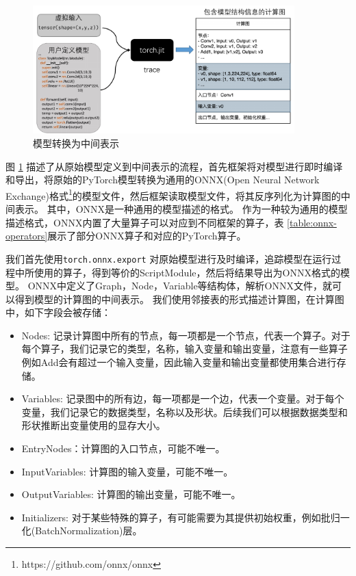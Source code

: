 \begin{figure}[h]
	\centering
	\includegraphics[width=0.9\textwidth]{figure/3-system/2ir.pdf}
	\caption{模型转换为中间表示}
	\label{fig:2IR}
\end{figure}

图 \ref{fig:2IR} 描述了从原始模型定义到中间表示的流程，首先框架将对模型进行即时编译和导出，将原始的PyTorch模型转换为通用的ONNX(Open Neural Network Exchange)格式\footnote[1]{https://github.com/onnx/onnx}的模型文件，然后框架读取模型文件，将其反序列化为计算图的中间表示。
其中，ONNX是一种通用的模型描述的格式。
作为一种较为通用的模型描述格式，ONNX内置了大量算子可以对应到不同框架的算子，表 \ref{table:onnx-operators}展示了部分ONNX算子和对应的PyTorch算子。



我们首先使用\texttt{torch.onnx.export} 对原始模型进行及时编译，追踪模型在运行过程中所使用的算子，得到等价的ScriptModule，然后将结果导出为ONNX格式的模型。
ONNX中定义了Graph，Node，Variable等结构体，解析ONNX文件，就可以得到模型的计算图的中间表示。
我们使用邻接表的形式描述计算图，在计算图中，如下字段会被存储：
\begin{itemize}
	\item Nodes: 记录计算图中所有的节点，每一项都是一个节点，代表一个算子。对于每个算子，我们记录它的类型，名称，输入变量和输出变量，注意有一些算子例如Add会有超过一个输入变量，因此输入变量和输出变量都使用集合进行存储。
	\item Variables: 记录图中的所有边，每一项都是一个边，代表一个变量。对于每个变量，我们记录它的数据类型，名称以及形状。后续我们可以根据数据类型和形状推断出变量使用的显存大小。
	\item EntryNodes：计算图的入口节点，可能不唯一。
	\item InputVariables: 计算图的输入变量，可能不唯一。
	\item OutputVariables: 计算图的输出变量，可能不唯一。
	\item Initializers: 对于某些特殊的算子，有可能需要为其提供初始权重，例如批归一化(BatchNormalization)层。
\end{itemize}

